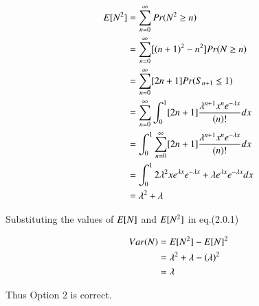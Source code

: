 \documentclass[journal,12pt,twocolumn]{IEEEtran}
\theoremstyle{definition}
\begin{document}
\begin{align}
    E[ N^2 ] &= \sum _{n = 0} ^\infty Pr(N^2 \geq n)\\
    &= \sum _{n = 0} ^\infty [(n+1)^2 - n^2] Pr(N \geq n)\\
    &= \sum _{n = 0} ^\infty [2n + 1] Pr(S_{n+1} \leq 1)\\
    &=  \sum _{n = 0} ^\infty \int _0 ^1 [2n+1] \frac{\lambda^{n+1} x^{n}e^{-\lambda x}}{(n)!} dx\\
    &= \int _0 ^1 \sum _{n = 0} ^\infty [2n+1]\frac{\lambda^{n+1} x^{n}e^{-\lambda x}}{(n)!} dx\\
    &= \int _0 ^1 2\lambda^2 x e^{\lambda x} e^{-\lambda x} + \lambda e^{\lambda x} e^{-\lambda x} dx\\
    &= \lambda ^2 + \lambda
\end{align}

Substituting the values of $E[ N ]$ and $E[ N^2 ]$ in eq.(2.0.1)

\begin{align}
    Var(N) &= E[ N^2 ] - E[ N ]^2\\
    &= \lambda^2 + \lambda - (\lambda)^2\\
    &= \lambda
\end{align}

Thus Option 2 is correct.
\end{document}
